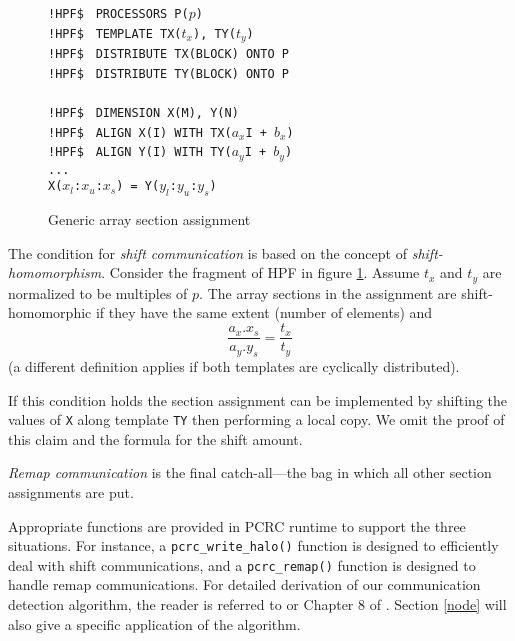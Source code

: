 \begin{figure}[bt]
\begin{tabbing}
{\tt  !HPF\$ } \= {\tt PROCESSORS P(}$p${\tt )} \\
{\tt  !HPF\$ } \> {\tt TEMPLATE TX(}$t_x${\tt), TY(}$t_y${\tt)} \\
{\tt  !HPF\$ } \> {\tt DISTRIBUTE TX(BLOCK) ONTO P} \\
{\tt  !HPF\$ } \> {\tt DISTRIBUTE TY(BLOCK) ONTO P} \\
\\
{\tt  !HPF\$ } \> {\tt DIMENSION X(M), Y(N)} \\
{\tt  !HPF\$ } \> {\tt ALIGN X(I) WITH TX(}$a_x${\tt * I + }$b_x${\tt )} \\
{\tt  !HPF\$ } \> {\tt ALIGN Y(I) WITH TY(}$a_y${\tt * I + }$b_y${\tt )} \\
               \> {\tt ...} \\
               \> {\tt X(}$x_l${\tt :}$x_u${\tt :}$x_s${\tt) = 
                       Y(}$y_l${\tt :}$y_u${\tt :}$y_s${\tt)} \\
\end{tabbing}
\caption{Generic array section assignment\label{homomorphism}}
\end{figure}

The condition for {\em shift communication} is based on the
concept of {\em shift-homomorphism}.
Consider the fragment of HPF in figure \ref{homomorphism}.
Assume $t_x$ and $t_y$ are normalized to be multiples of $p$.
The array sections in the assignment are shift-homomorphic if
they have the same extent (number of elements) and
\begin{equation}
\frac{a_x . x_s}{a_y . y_s} = \frac{t_x}{t_y}
\end{equation}
(a different definition applies if both templates are
cyclically distributed).

If this condition holds the section assignment can
be implemented by shifting the values of {\tt X} along template
{\tt TY} then performing a local copy.  We omit the proof of this
claim and the formula for the shift amount.

{\em Remap communication} is the final catch-all---the bag in which all
other section assignments are put.

Appropriate functions are provided in PCRC runtime to support
the three situations. For instance, a {\tt pcrc\_write\_halo()}
function is designed to efficiently deal with shift
communications, and a {\tt pcrc\_remap()} function is designed
to handle remap communications.  For detailed derivation
of our communication detection algorithm, the reader is
referred to \cite{forall:1} or Chapter 8 of \cite{Li97}.
Section \ref{node} will also give a specific application of the 
algorithm.

